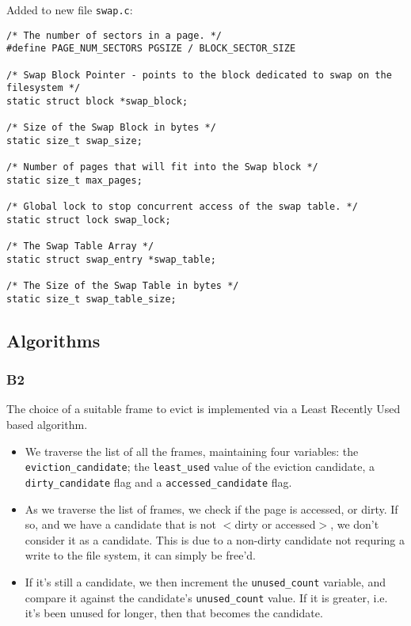 \documentclass[a4wide, 11pt]{article}
\newcommand{\tx}{\texttt}
\begin{document}
Added to new file \tx{swap.c}:
\begin{verbatim}
/* The number of sectors in a page. */
#define PAGE_NUM_SECTORS PGSIZE / BLOCK_SECTOR_SIZE 

/* Swap Block Pointer - points to the block dedicated to swap on the filesystem */
static struct block *swap_block; 

/* Size of the Swap Block in bytes */
static size_t swap_size;

/* Number of pages that will fit into the Swap block */
static size_t max_pages;         

/* Global lock to stop concurrent access of the swap table. */
static struct lock swap_lock;        

/* The Swap Table Array */
static struct swap_entry *swap_table;

/* The Size of the Swap Table in bytes */
static size_t swap_table_size;
\end{verbatim}


\subsection{Algorithms}
\subsubsection{B2}
The choice of a suitable frame to evict is implemented via a Least Recently Used based algorithm.\\

\begin{itemize}
\item We traverse the list of all the frames, maintaining four variables: the \tx{eviction\_candidate}; the \tx{least\_used} value of the eviction candidate, a \tx{dirty\_candidate} flag and a \tx{accessed\_candidate} flag.

\item As we traverse the list of frames, we check if the page is accessed, or dirty. If so, and we have a candidate that is not $<$dirty or accessed$>$, we don't consider it as a candidate. This is due to a non-dirty candidate not requring a write to the file system, it can simply be free'd.

\item If it's still a candidate, we then increment the \tx{unused\_count} variable, and compare it against the candidate's \tx{unused\_count} value. If it is greater, i.e. it's been unused for longer, then that becomes the candidate.
\end{itemize}
\end{document}
